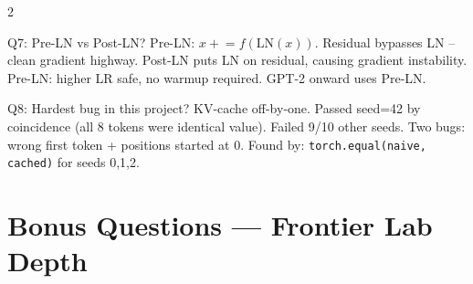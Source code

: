 \documentclass[10pt,a4paper]{article}
\begin{document}
\begin{multicols}{2}
\begin{interviewbox}{Q7: Pre-LN vs Post-LN?}
Pre-LN: $x \mathrel{+}= f(\text{LN}(x))$.
Residual bypasses LN -- clean gradient highway.
Post-LN puts LN on residual, causing gradient instability.
Pre-LN: higher LR safe, no warmup required. GPT-2 onward uses Pre-LN.
\end{interviewbox}

\begin{interviewbox}{Q8: Hardest bug in this project?}
KV-cache off-by-one. Passed seed=42 by coincidence (all 8 tokens were identical value). Failed 9/10 other seeds. Two bugs: wrong first token + positions started at 0.
Found by: \texttt{torch.equal(naive, cached)} for seeds 0,1,2.
\end{interviewbox}

\end{multicols}

\section{Bonus Questions --- Frontier Lab Depth}
\end{document}
